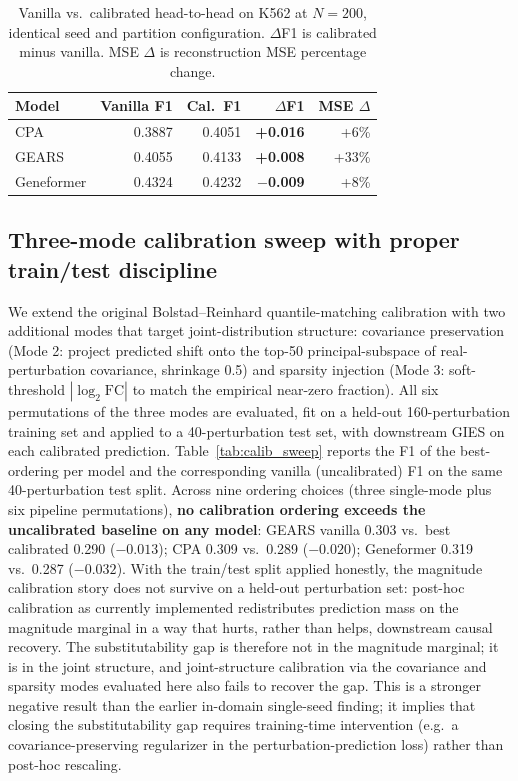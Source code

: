 \documentclass{article}
\theoremstyle{plain}
\theoremstyle{definition}
\theoremstyle{remark}
\begin{document}
\begin{table}[h]
\caption{Vanilla vs.\ calibrated head-to-head on K562 at $N{=}200$, identical seed and partition configuration. $\Delta$F1 is calibrated minus vanilla. MSE $\Delta$ is reconstruction MSE percentage change.}
\label{tab:cal}
\vskip 0.1in
\centering
\small
\setlength{\tabcolsep}{4.5pt}
\begin{tabular}{lrrrr}
\toprule
\textbf{Model} & \textbf{Vanilla F1} & \textbf{Cal.\ F1} & \textbf{$\Delta$F1} & \textbf{MSE $\Delta$} \\
\midrule
CPA        & 0.3887 & 0.4051 & \textbf{+0.016} & +6\%  \\
GEARS      & 0.4055 & 0.4133 & \textbf{+0.008} & +33\% \\
Geneformer & 0.4324 & 0.4232 & \textbf{$-$0.009} & +8\%  \\
\bottomrule
\end{tabular}
\vskip -0.1in
\end{table}

\subsection{Three-mode calibration sweep with proper train/test discipline}
\label{sec:calib-sweep}
We extend the original Bolstad--Reinhard quantile-matching calibration with two additional modes that target joint-distribution structure: covariance preservation (Mode 2: project predicted shift onto the top-50 principal-subspace of real-perturbation covariance, shrinkage 0.5) and sparsity injection (Mode 3: soft-threshold $|\log_2 \mathrm{FC}|$ to match the empirical near-zero fraction). All six permutations of the three modes are evaluated, fit on a held-out 160-perturbation training set and applied to a 40-perturbation test set, with downstream GIES on each calibrated prediction. Table~\ref{tab:calib_sweep} reports the F1 of the best-ordering per model and the corresponding vanilla (uncalibrated) F1 on the same 40-perturbation test split. Across nine ordering choices (three single-mode plus six pipeline permutations), \textbf{no calibration ordering exceeds the uncalibrated baseline on any model}: GEARS vanilla 0.303 vs.\ best calibrated 0.290 ($-0.013$); CPA 0.309 vs.\ 0.289 ($-0.020$); Geneformer 0.319 vs.\ 0.287 ($-0.032$). With the train/test split applied honestly, the magnitude calibration story does not survive on a held-out perturbation set: post-hoc calibration as currently implemented redistributes prediction mass on the magnitude marginal in a way that hurts, rather than helps, downstream causal recovery. The substitutability gap is therefore not in the magnitude marginal; it is in the joint structure, and joint-structure calibration via the covariance and sparsity modes evaluated here also fails to recover the gap. This is a stronger negative result than the earlier in-domain single-seed finding; it implies that closing the substitutability gap requires training-time intervention (e.g.\ a covariance-preserving regularizer in the perturbation-prediction loss) rather than post-hoc rescaling.
\end{document}
